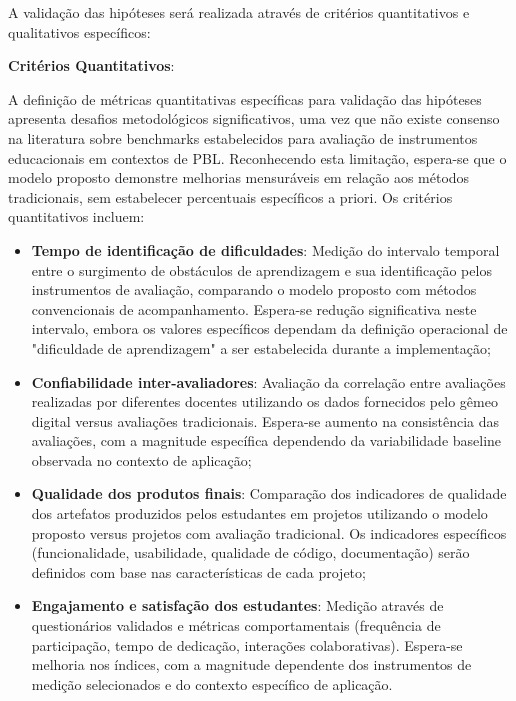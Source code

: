 \documentclass[12pt,a4paper]{article}
\begin{document}
A validação das hipóteses será realizada através de critérios quantitativos e
qualitativos específicos:

\textbf{Critérios Quantitativos}:

A definição de métricas quantitativas específicas para validação das hipóteses
apresenta desafios metodológicos significativos, uma vez que não existe
consenso na literatura sobre benchmarks estabelecidos para avaliação de
instrumentos educacionais em contextos de PBL. Reconhecendo esta limitação,
espera-se que o modelo proposto demonstre melhorias mensuráveis em relação aos
métodos tradicionais, sem estabelecer percentuais específicos a priori. Os
critérios quantitativos incluem:

\begin{itemize}
  \item \textbf{Tempo de identificação de dificuldades}: Medição do intervalo temporal entre o surgimento de obstáculos de aprendizagem e sua identificação pelos instrumentos de avaliação, comparando o modelo proposto com métodos convencionais de acompanhamento. Espera-se redução significativa neste intervalo, embora os valores específicos dependam da definição operacional de "dificuldade de aprendizagem" a ser estabelecida durante a implementação;

  \item \textbf{Confiabilidade inter-avaliadores}: Avaliação da correlação entre avaliações realizadas por diferentes docentes utilizando os dados fornecidos pelo gêmeo digital versus avaliações tradicionais. Espera-se aumento na consistência das avaliações, com a magnitude específica dependendo da variabilidade baseline observada no contexto de aplicação;

  \item \textbf{Qualidade dos produtos finais}: Comparação dos indicadores de qualidade dos artefatos produzidos pelos estudantes em projetos utilizando o modelo proposto versus projetos com avaliação tradicional. Os indicadores específicos (funcionalidade, usabilidade, qualidade de código, documentação) serão definidos com base nas características de cada projeto;

  \item \textbf{Engajamento e satisfação dos estudantes}: Medição através de questionários validados e métricas comportamentais (frequência de participação, tempo de dedicação, interações colaborativas). Espera-se melhoria nos índices, com a magnitude dependente dos instrumentos de medição selecionados e do contexto específico de aplicação.
\end{itemize}
\end{document}

